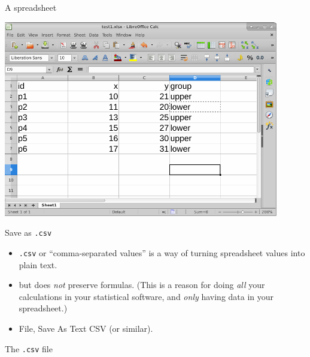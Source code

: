 \documentclass[unknownkeysallowed]{beamer}\usepackage[]{graphicx}\usepackage[]{color}
\begin{document}
\begin{frame}[fragile]{A spreadsheet}
  
  \includegraphics[width=0.9\textwidth]{spreadsheet}
  
\end{frame}

\begin{frame}[fragile]{Save as \texttt{.csv}}
  
  \begin{itemize}
  \item \texttt{.csv} or ``comma-separated values'' is a way of
    turning spreadsheet values into plain text.
  \item but does \emph{not} preserve formulas. (This is a reason for
    doing \emph{all} your calculations in your statistical software,
    and \emph{only} having data in your spreadsheet.)
  \item File, Save As Text CSV (or similar).
  \end{itemize}
  
\end{frame}

\begin{frame}[fragile]{The \texttt{.csv} file}
  

  
\end{frame}
\end{document}
